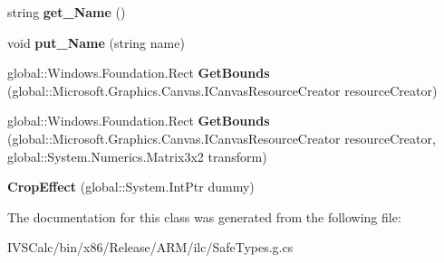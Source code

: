 \begin{DoxyCompactItemize}
\item 
\mbox{\label{class_microsoft_1_1_graphics_1_1_canvas_1_1_effects_1_1_crop_effect_a72cce75bc82702ace2cf670880ad7356}} 
string {\bfseries get\+\_\+\+Name} ()
\item 
\mbox{\label{class_microsoft_1_1_graphics_1_1_canvas_1_1_effects_1_1_crop_effect_a01378ce5907a9c77e65397173594ba4a}} 
void {\bfseries put\+\_\+\+Name} (string name)
\item 
\mbox{\label{class_microsoft_1_1_graphics_1_1_canvas_1_1_effects_1_1_crop_effect_a9205352b6c62c823e67992127aa11346}} 
global\+::\+Windows.\+Foundation.\+Rect {\bfseries Get\+Bounds} (global\+::\+Microsoft.\+Graphics.\+Canvas.\+I\+Canvas\+Resource\+Creator resource\+Creator)
\item 
\mbox{\label{class_microsoft_1_1_graphics_1_1_canvas_1_1_effects_1_1_crop_effect_a16b720a896e82a3c3dd7f6de5b04f6f0}} 
global\+::\+Windows.\+Foundation.\+Rect {\bfseries Get\+Bounds} (global\+::\+Microsoft.\+Graphics.\+Canvas.\+I\+Canvas\+Resource\+Creator resource\+Creator, global\+::\+System.\+Numerics.\+Matrix3x2 transform)
\item 
\mbox{\label{class_microsoft_1_1_graphics_1_1_canvas_1_1_effects_1_1_crop_effect_a0c77e082f46f52291276ece0f7fae253}} 
{\bfseries Crop\+Effect} (global\+::\+System.\+Int\+Ptr dummy)
\end{DoxyCompactItemize}


The documentation for this class was generated from the following file\+:\begin{DoxyCompactItemize}
\item 
I\+V\+S\+Calc/bin/x86/\+Release/\+A\+R\+M/ilc/Safe\+Types.\+g.\+cs\end{DoxyCompactItemize}
